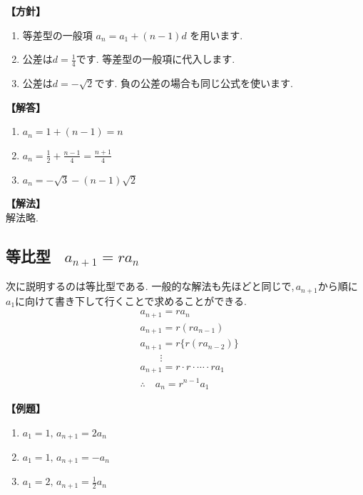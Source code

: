 \documentclass[dvipdfmx,a4paper,11pt,fleqn,openany]{jsbook}
\begin{document}
      \noindent\textbf{【方針】}
      \begin{enumerate}[label=(\arabic*),parsep=3pt]
        \item 等差型の一般項
              $\displaystyle a_n=a_1+(n-1)d$
              を用います.
        \item 公差は$\displaystyle d=\frac14$です.
              等差型の一般項に代入します.
        \item 公差は$\displaystyle d=-\sqrt2$です.
              負の公差の場合も同じ公式を使います.
      \end{enumerate}

      \noindent\textbf{【解答】}
      \begin{enumerate}[label=(\arabic*),parsep=3pt]
        \item $\displaystyle a_n=1+(n-1)=n$
        \item $\displaystyle a_n=\frac12+\frac{n-1}{4}
              =\frac{n+1}{4}$
        \item $\displaystyle a_n=-\sqrt3-(n-1)\sqrt2$
      \end{enumerate}

      \noindent\textbf{【解法】}\\
      解法略.
    \subsection{等比型 \, $a_{n+1}=ra_n$}
      次に説明するのは等比型である.
      一般的な解法も先ほどと同じで,\,$a_{n+1}$から順に$a_1$に向けて書き下して行くことで求めることができる.
      \begin{align*}
        &a_{n+1}=ra_n\\
        &a_{n+1}=r(ra_{n-1})\\
        &a_{n+1}=r\{r(ra_{n-2})\}\\
        &\qquad \vdots\\
        &a_{n+1}=r\cdot r \cdot \cdots \cdot ra_1\\
        &\therefore \quad a_n=r^{n-1}a_1
      \end{align*}

      \noindent \textbf{【例題】}
      \begin{enumerate}[label=(\arabic*),parsep=3pt]
        \item $\displaystyle a_1=1,\, a_{n+1}=2a_n$
        \item $\displaystyle a_1=1,\, a_{n+1}=-a_n$
        \item $\displaystyle a_1=2,\, a_{n+1}=\frac{1}{2}a_n$
      \end{enumerate}
\end{document}
